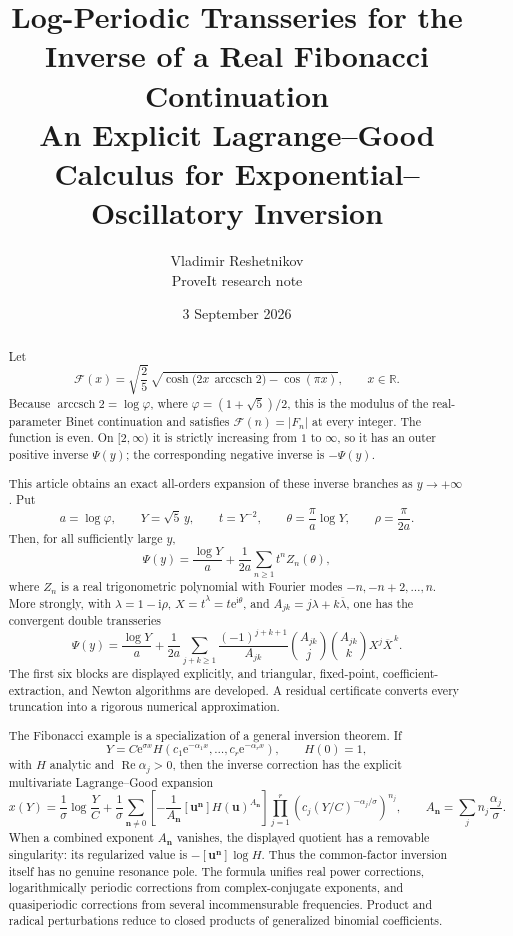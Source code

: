 \documentclass[11pt,oneside]{article}
\theoremstyle{plain}
\theoremstyle{definition}
\theoremstyle{remark}
\newcommand{\e}{\mathrm{e}}
\newcommand{\ii}{\mathrm{i}}
\newcommand{\R}{\mathbb{R}}
\newcommand{\Fcal}{\mathcal{F}}
\newcommand{\phig}{\varphi}
\newcommand{\abs}[1]{\left\lvert#1\right\rvert}
\newcommand{\Real}{\operatorname{Re}}
\newcommand{\arccsch}{\operatorname{arccsch}}
\begin{document}
\title{\textbf{Log-Periodic Transseries for the Inverse of a Real Fibonacci Continuation}\\[0.35em]
  \Large An Explicit Lagrange--Good Calculus for Exponential--Oscillatory Inversion}
\author{Vladimir Reshetnikov\\
  \small ProveIt research note}
\date{3 September 2026}
\maketitle

\begin{abstract}
Let
\[
 \Fcal(x)=\sqrt{\frac25}\,
 \sqrt{\cosh\!\bigl(2x\,\arccsch 2\bigr)-\cos(\pi x)},
 \qquad x\in\R.
\]
Because \(\arccsch 2=\log\phig\), where
\(\phig=(1+\sqrt5)/2\), this is the modulus of the real-parameter Binet
continuation and satisfies \(\Fcal(n)=\abs{F_n}\) at every integer.  The
function is even.  On \([2,\infty)\) it is strictly increasing from \(1\) to
\(\infty\), so it has an outer positive inverse \(\Psi(y)\); the corresponding
negative inverse is \(-\Psi(y)\).

This article obtains an exact all-orders expansion of these inverse branches as
\(y\to+\infty\).  Put
\[
 a=\log\phig,\qquad Y=\sqrt5\,y,\qquad
 t=Y^{-2},\qquad
 \theta=\frac{\pi}{a}\log Y,\qquad
 \rho=\frac{\pi}{2a}.
\]
Then, for all sufficiently large \(y\),
\[
 \Psi(y)=\frac{\log Y}{a}
 +\frac1{2a}\sum_{n\ge1}t^n Z_n(\theta),
\]
where \(Z_n\) is a real trigonometric polynomial with Fourier modes
\(-n,-n+2,\ldots,n\).  More strongly, with
\(\lambda=1-\ii\rho\), \(X=t^\lambda=t\e^{\ii\theta}\), and
\(A_{jk}=j\lambda+k\overline\lambda\), one has the convergent double
transseries
\[
 \Psi(y)=\frac{\log Y}{a}
 +\frac1{2a}\sum_{j+k\ge1}
 \frac{(-1)^{j+k+1}}{A_{jk}}
 \binom{A_{jk}}{j}\binom{A_{jk}}{k}
 X^j\overline X^{\,k}.
\]
The first six blocks are displayed explicitly, and triangular, fixed-point,
coefficient-extraction, and Newton algorithms are developed.  A residual
certificate converts every truncation into a rigorous numerical approximation.

The Fibonacci example is a specialization of a general inversion theorem.  If
\[
 Y=C\e^{\sigma x}
 H\!\left(c_1\e^{-\alpha_1x},\ldots,c_r\e^{-\alpha_rx}\right),
 \qquad H(0)=1,
\]
with \(H\) analytic and \(\Real\alpha_j>0\), then the inverse correction has
the explicit multivariate Lagrange--Good expansion
\[
 x(Y)=\frac1\sigma\log\frac YC
 +\frac1\sigma\sum_{\bm n\ne0}
 \left[-\frac1{A_{\bm n}}
   [\bm u^{\bm n}]H(\bm u)^{A_{\bm n}}\right]
 \prod_{j=1}^r\left(c_j(Y/C)^{-\alpha_j/\sigma}\right)^{n_j},
 \qquad
 A_{\bm n}=\sum_j n_j\frac{\alpha_j}{\sigma}.
\]
When a combined exponent \(A_{\bm n}\) vanishes, the displayed quotient has
a removable singularity: its regularized value is
\(-[\bm u^{\bm n}]\log H\).  Thus the common-factor inversion itself has no
genuine resonance pole.  The formula unifies real power corrections,
logarithmically periodic corrections from complex-conjugate exponents, and
quasiperiodic corrections from several incommensurable frequencies.  Product
and radical perturbations reduce to closed products of generalized binomial
coefficients.
\end{abstract}
\end{document}
